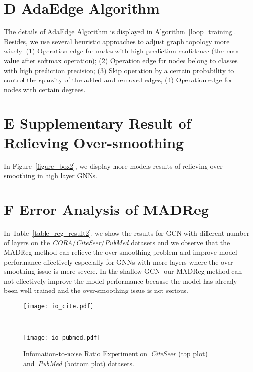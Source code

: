 \documentclass[letterpaper]{article} \usepackage{aaai20}  \usepackage{times}  \usepackage{helvet} \usepackage{courier}  \usepackage[hyphens]{url}  \usepackage{graphicx} \urlstyle{rm} \def\UrlFont{\rm}  \frenchspacing  \setlength{\pdfpagewidth}{8.5in}  \setlength{\pdfpageheight}{11in}  \setcounter{secnumdepth}{0}
\begin{document}
\section{D AdaEdge Algorithm}
The details of AdaEdge Algorithm is displayed in Algorithm~\ref{loop_training}.
Besides, we use several heuristic approaches to adjust graph topology more wisely: (1) Operation edge for nodes with high prediction confidence (the max value after softmax operation); (2) Operation edge for nodes belong to classes with high prediction precision; (3) Skip operation by a certain probability to control the sparsity of the added and removed edges; (4) Operation edge for nodes with certain degrees.

\section{E Supplementary Result of Relieving Over-smoothing}
In Figure~\ref{figure_box2}, we display more models results of relieving over-smoothing in high layer GNNs. 

\section{F Error Analysis of MADReg}
In Table~\ref{table_reg_result2}, we show the results for GCN with different number of layers on the \textit{CORA}/\textit{CiteSeer}/\textit{PubMed} datasets and we observe that the MADReg method can relieve the over-smoothing problem and improve model performance effectively especially for GNNs with more layers where the over-smoothing issue is more severe.
In the shallow GCN, our MADReg method can not effectively improve the model performance because the model has already been well trained and the over-smoothing issue is not serious.

\begin{figure*}[t]
\centering
\small
\begin{minipage}{1.0\textwidth}
  \centering
  \texttt{[image: io\_cite.pdf]}
\end{minipage}\\
\begin{minipage}{1.0\textwidth}
  \centering
  \texttt{[image: io\_pubmed.pdf]}
\end{minipage}\caption{Infomation-to-noise Ratio Experiment on~\textit{CiteSeer} (top plot) and~\textit{PubMed} (bottom plot) datasets.}
\label{figure_mergeB}
\end{figure*}
\end{document}
